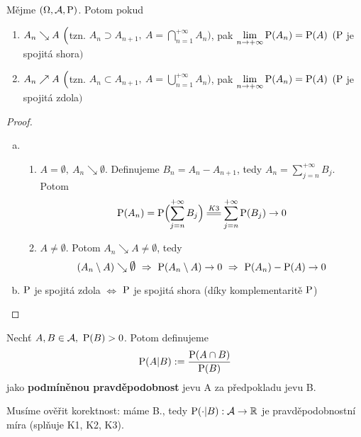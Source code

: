 \begin{theorem}
	Mějme $(\Omega,\mathcal{A},\mathrm{P})$. Potom pokud
	\begin{enumerate}[	a)]
		\item $A_n \searrow A~\Bigl($tzn. $A_n \supset A_{n+1},~A=\bigcap\limits_{n=1}^{+\infty}A_n\Bigr)$, pak
		$ \lim\limits_{n \to +\infty} \mathrm{P}(A_n)=\mathrm{P}(A)$ $(\mathrm{P}$ je spojitá shora$)$
		\item $A_n \nearrow A~\Bigl($tzn. $A_n \subset A_{n+1},~A=\bigcup\limits_{n=1}^{+\infty}A_n\Bigr)$, pak
		$ \lim\limits_{n \to +\infty} \mathrm{P}(A_n)=\mathrm{P}(A)$ $(\mathrm{P}$ je spojitá zdola$)$
	\end{enumerate}
	\begin{proof}~
		\begin{enumerate}[a)]
			\item \begin{enumerate}[1.]
				\item  $A=\emptyset,~A_n \searrow \emptyset$. Definujeme $B_n=A_n-A_{n+1}$, tedy $A_n=\sum\limits_{j=n}^{+\infty} B_j$. Potom	
				$$\PP(A_n)=\PP\Bigl(\sum\limits_{j=n}^{+\infty} B_j\Bigr)\equal{K3}\sum\limits_{j=n}^{+\infty} \PP(B_j) \to 0$$	
				\item$A \neq \emptyset$. Potom $A_n \searrow A \neq \emptyset$, tedy 
				$$(A_n \setminus A) \searrow  \emptyset ~\Rightarrow~ \PP(A_n \setminus A) \to 0 ~\Rightarrow~ \PP(A_n)-\PP(A) \to 0$$
			\end{enumerate}
		\item  $\mathrm{P}$ je spojitá zdola $\Leftrightarrow$ $\mathrm{P}$ je spojitá shora (díky komplementaritě $\mathrm{P}$)
		\end{enumerate}
	\end{proof}
\end{theorem}
\begin{define}
	\label{ppp}
	Nechť $A,B \in \mathcal{A} ,~\mathrm{P}(B)>0$. Potom definujeme 
	\[
	\mathrm{P}(A|B):=\frac{\mathrm{P}(A \cap B)}{\mathrm{P}(B)}
	\] jako \textbf{podmíněnou pravděpodobnost} jevu A za předpokladu jevu B.

\end{define}
\begin{remark}
		Musíme ověřit korektnost: máme B., tedy $\mathrm{P}(\cdot | B): \mathcal{A}\to\mathbb{R}$ je pravděpodobnostní míra (splňuje K1, K2, K3).	
\end{remark}

